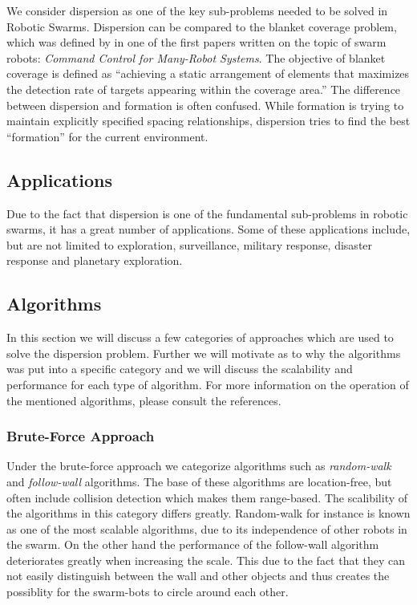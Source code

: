 We consider dispersion as one of the key sub-problems needed to be solved in Robotic Swarms.\cite{ugur2007dispersion,mclurkin2007distributed,ludwig2006robotic} Dispersion can be compared to the blanket coverage problem, which was defined by in one of the first papers written on the topic of swarm robots: \emph{Command Control for Many-Robot Systems}.\cite{gage1992command} The objective of blanket coverage is defined as ``achieving a static arrangement of elements that maximizes the detection rate of targets appearing within the coverage area.''\cite{gage1992command} The difference between dispersion and formation is often confused. While formation is trying to maintain explicitly specified spacing relationships, dispersion tries to find the best ``formation'' for the current environment. 

\subsection{Applications}
Due to the fact that dispersion is one of the fundamental sub-problems in robotic swarms, it has a great number of applications.
Some of these applications include, but are not limited to exploration, surveillance, military response, disaster response and planetary exploration.\cite{ludwig2006robotic,Penders2011,mclurkin2007distributed} 

\subsection{Algorithms}
In this section we will discuss a few categories of approaches which are used to solve the dispersion problem.
Further we will motivate as to why the algorithms was put into a specific category and we will discuss the scalability and performance for each type of algorithm.
For more information on the operation of the mentioned algorithms, please consult the references.

\subsubsection{Brute-Force Approach}
Under the brute-force approach we categorize algorithms such as \emph{random-walk} and \emph{follow-wall} algorithms.\cite{morlok2007dispersing} 
The base of these algorithms are location-free, but often include collision detection which makes them range-based.
The scalibility of the algorithms in this category differs greatly.
Random-walk for instance is known as one of the most scalable algorithms, due to its independence of other robots in the swarm.
On the other hand the performance of the follow-wall algorithm deteriorates greatly when increasing the scale. 
This due to the fact that they can not easily distinguish between the wall and other objects and thus creates the possiblity for the swarm-bots to circle around each other.

